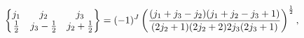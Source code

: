 \[\begin{Bmatrix}j_{1}&j_{2}&j_{3}\\
\frac{1}{2}&j_{3}-\frac{1}{2}&j_{2}+\frac{1}{2}\end{Bmatrix}=(-1)^{J}\left(%
\frac{(j_{1}+j_{3}-j_{2})(j_{1}+j_{2}-j_{3}+1)}{(2j_{2}+1)(2j_{2}+2)2j_{3}(2j_%
{3}+1)}\right)^{\frac{1}{2}},\]
